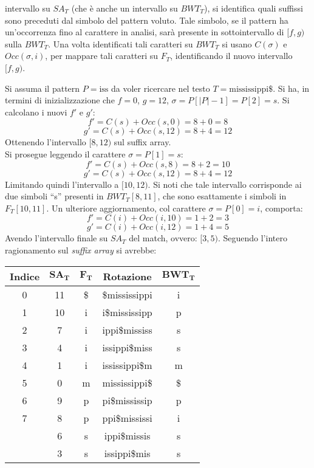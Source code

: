 intervallo su $SA_T$ (che è anche un intervallo su $BWT_T$), si identifica quali
suffissi sono preceduti dal simbolo del pattern voluto. Tale simbolo, se il
pattern ha un'occorrenza fino al carattere in analisi, sarà presente in
sottointervallo di $[f,g)$ sulla $BWT_T$. Una volta identificati tali caratteri
su $BWT_T$ si usano $C(\sigma)$ e $Occ(\sigma, i)$, per mappare tali caratteri
su $F_T$, identificando il nuovo intervallo $[f,g)$.
\begin{esempio}
  Si assuma il pattern $P=\mbox{iss}$ da voler ricercare nel testo
  $T=\mbox{mississippi\$}$. 
  Si ha, in termini di inizializzazione che $f=0$, $g=12$,
  $\sigma=P[|P|-1]=P[2]=s$. Si calcolano i nuovi $f'$ e $g'$:
  \[f'=C(s)+Occ(s, 0)=8+0=8\]
  \[g'=C(s)+Occ(s, 12)=8+4=12\]
  Ottenendo l'intervallo $[8,12)$ sul suffix array.\\
  Si prosegue leggendo il carattere $\sigma=P[1]=s$:
  \[f'=C(s)+Occ(s, 8)=8+2=10\]
  \[g'=C(s)+Occ(s, 12)=8+4=12\]
  Limitando quindi l'intervallo a $[10,12)$. Si noti che tale intervallo
  corrisponde ai due simboli ``s'' presenti in $BWT_T[8,11]$, che sono
  esattamente i simboli in $F_T[10,11]$.
  Un ulteriore aggiornamento, col carattere $\sigma=P[0]=i$, comporta:
  \[f'=C(i)+Occ(i, 10)=1+2=3\]
  \[g'=C(i)+Occ(i, 12)=1+4=5\]
  Avendo l'intervallo finale su $SA_T$ del match, ovvero: $[3,5)$.
  Seguendo l'intero ragionamento sul \textit{suffix array} si avrebbe:
  \begin{table}[H]
    \centering
    \scriptsize
    \begin{tabular}{c|c|c|c|c} 
      \textbf{Indice} & $\mathbf{SA_T}$ & $\mathbf{F_T}$ & \textbf{Rotazione}
      & $\mathbf{BWT_T}$\\ 
      \hline
      0 & 11 & \$ & \$mississippi & i\\
      1 & 10 & i & i\$mississipp & p\\
      2 & 7 & i & ippi\$mississ & s\\
      3 & 4 & i & issippi\$miss & s\\
      4 & 1 & i & ississippi\$m & m\\
      5 & 0 & m & mississippi\$ & \$\\
      6 & 9 & p & pi\$mississip & p\\
      7 & 8 & p & ppi\$mississi & i\\
      {\color{nordred}{8}} & 6 & s & {\color{nordred}{s}}ippi\$missis & s\\
      {\color{nordred}{9}} & 3 & s & {\color{nordred}{s}}issippi\$mis & s\\

\end{tabular}
\end{table}
\end{esempio}
